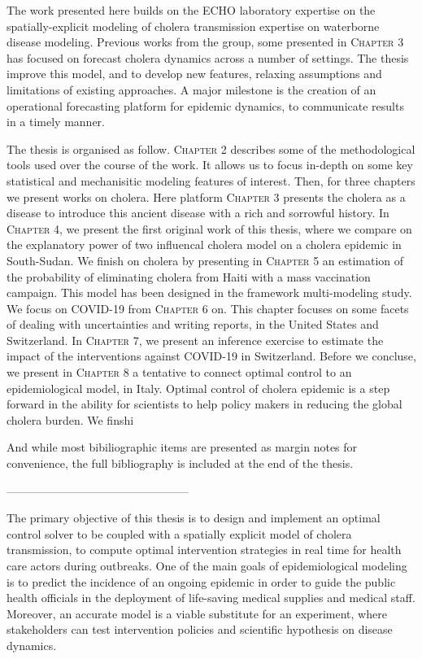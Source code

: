 The work presented here builds on the ECHO laboratory expertise on the spatially-explicit modeling of cholera transmission expertise on waterborne disease modeling. Previous works from the group, some presented in \textsc{Chapter 3} has focused on forecast cholera dynamics across a number of settings. The thesis  improve this model, and to develop new features, relaxing assumptions and limitations of existing approaches. A major milestone is the creation of an operational forecasting platform for epidemic dynamics, to communicate results in a timely manner.

The thesis is organised as follow. \textsc{Chapter 2} describes some of the methodological tools used over the course of the work. It allows us to focus in-depth on some key statistical and mechanisitic modeling features of interest. Then, for three chapters we present works on cholera. Here platform \textsc{Chapter 3} presents the cholera as a disease to introduce this ancient disease with a rich and sorrowful history. In  \textsc{Chapter 4}, we present the first original work of this thesis, where we compare on the explanatory power of two influencal cholera model on a cholera epidemic in South-Sudan.  We finish on cholera by presenting in \textsc{Chapter 5} an estimation of the probability of eliminating cholera from Haiti with a mass vaccination campaign. This model has been designed in the framework multi-modeling study. We focus on COVID-19 from \textsc{Chapter 6} on. This chapter focuses on some facets of dealing with uncertainties and writing reports, in the United States and Switzerland. In \textsc{Chapter 7}, we present an inference exercise to estimate the impact of the interventions against COVID-19 in Switzerland. Before we concluse, we present in \textsc{Chapter 8} a tentative to connect optimal control to an epidemiological model, in Italy. Optimal control of cholera epidemic is a step forward in the ability for scientists to help policy makers in reducing the global cholera burden. 
We finshi

And while most bibiliographic items are presented as margin notes for convenience, the full bibliography is included at the end of the thesis.


————————————————

The  primary objective of this thesis is to design and implement an optimal control solver to be coupled with a spatially explicit model of cholera transmission, to compute optimal intervention strategies in real time for health care actors during outbreaks.
One of the main goals of epidemiological modeling is to predict the incidence of an ongoing epidemic in order to guide the public health officials in the deployment of life-saving medical supplies and medical staff. Moreover, an accurate model is a viable substitute for an experiment, where stakeholders can test intervention policies and scientific hypothesis on disease dynamics.

